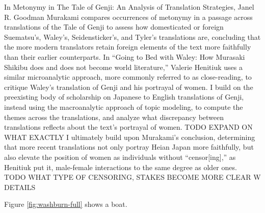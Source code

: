 \documentclass[12pt]{article}
\begin{document}
\begin{flushleft}
\begin{spacing}{2.0}
\setlength{\parindent}{0.5in}

In Metonymy in The Tale of Genji: An Analysis of Translation Strategies, Janel R. Goodman Murakami compares occurrences of metonymy in a passage across translations of the Tale of Genji to assess how domesticated or foreign Suematsu’s, Waley’s, Seidensticker’s, and Tyler’s translations are, concluding that the more modern translators retain foreign elements of the text more faithfully than their earlier counterparts. In ``Going to Bed with Waley: How Murasaki Shikibu does and does not become world literature,'' Valerie Henitiuk uses a similar microanalytic approach, more commonly referred to as close-reading, to critique Waley’s translation of Genji and his portrayal of women. I build on the preexisting body of scholarship on Japanese to English translations of Genji, instead using the macroanalytic approach of topic modeling, to compute the themes across the translations, and analyze what discrepancy between translations reflects about the text’s portrayal of women. TODO EXPAND ON WHAT EXACTLY I ultimately build upon Murakami’s conclusion, determining that more recent translations not only portray Heian Japan more faithfully, but also elevate the position of women as individuals without ``censor[ing],'' as Henitiuk put it, male-female interactions to the same degree as older ones. TODO WHAT TYPE OF CENSORING, STAKES BECOME MORE CLEAR W DETAILS


Figure \ref{fig:washburn-full} shows a boat.


\end{spacing}
\end{flushleft}
\end{document}
